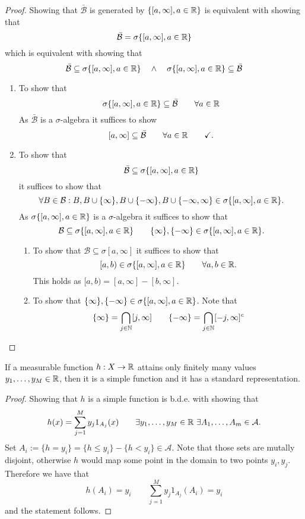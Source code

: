 \begin{proof}
Showing that \(\bar{\mathcal{B}}\) is generated by \(\{[a,\infty ],a\in \Bbb{R}\}\) is equivalent with showing that
\[
\bar{\mathcal{B}}=\sigma \{[a,\infty ],a\in \Bbb{R}\}
\]
which is equivalent with showing that
\[
\bar{\mathcal{B}}\subseteq \sigma \{[a,\infty ],a\in \Bbb{R}\} \quad \wedge  \quad \sigma \{[a,\infty ],a\in \Bbb{R}\} \subseteq \bar{\mathcal{B}}
\]

\begin{enumerate}
  \item To show that
\[
\sigma \{[a,\infty ],a\in \Bbb{R}\} \subseteq \bar{\mathcal{B}} \qquad \forall a\in \Bbb{R}
\]
As \(\bar{\mathcal{B}}\) is a \(\sigma \)-algebra it suffices to show
\[
[a,\infty ] \subseteq \bar{\mathcal{B}} \qquad \forall a\in \Bbb{R}\qquad \checkmark.
\]
  \item To show that
\[
\bar{\mathcal{B}}\subseteq \sigma \{[a,\infty ],a\in \Bbb{R}\} 
\]
it suffices to show that
\[
\forall B\in \mathcal{B} : B,B\cup \{\infty \},B\cup \{-\infty \},B\cup \{-\infty ,\infty \}\in \sigma \{[a,\infty ],a\in \Bbb{R}\}.
\]
As \(\sigma \{[a,\infty ],a\in \Bbb{R}\}\) is a \(\sigma \)-algebra it suffices to show that
\[
\mathcal{B}\subseteq \sigma \{[a,\infty ],a\in \Bbb{R}\} \qquad \{\infty \},\{-\infty \}\in \sigma \{[a,\infty ],a\in \Bbb{R}\}.
\]
\begin{enumerate}
  \item To show that \(\mathcal{B}\subseteq \sigma [a,\infty ]\) it suffices to show that
\[
[a,b)\in \sigma \{[a,\infty ],a\in \Bbb{R}\} \qquad \forall a,b\in \Bbb{R}.
\]
This holds as \([a,b)=[a,\infty ]-[b,\infty ].\)
  \item To show that \(\{\infty \},\{-\infty \}\in \sigma \{[a,\infty ],a\in \Bbb{R}\}\). Note that
\[
\{\infty \}=\bigcap _{j\in \Bbb{N}}[j,\infty ] \qquad \{-\infty \}=\bigcap _{j\in \Bbb{N}}[-j,\infty ]^c
\]
\end{enumerate}
\end{enumerate}

\end{proof}

\begin{prop}
If a measurable function \(h:X\rightarrow \Bbb{R}\) attains only finitely many values \(y_{1},\ldots ,y_M\in \Bbb{R}\), then it is a simple function and it has a standard representation.
\end{prop}

\begin{proof}
Showing that \(h\) is a simple function is b.d.e. with showing that
\[
h(x)=\sum _{j=1}^M y_{j}1_{A_{j}}(x) \qquad \exists y_{1},\ldots ,y_M\in \Bbb{R}\  \exists A_{1},\ldots ,A_{m}\in \mathcal{A}.
\]
Set \(A_{i}:=\{h=y_{i}\}=\{h\leq y_{i}\}-\{h<y_{i}\}\in \mathcal{A}\). Note that those sets are mutally disjoint, otherwise \(h\) would map some point in the domain to two points \(y_{i},y_{j}\). Therefore we have that
\[
h(A_{i})=y_{i} \qquad \sum _{j=1}^M y_{j}1_{A_{j}}(A_{i})=y_{i}
\]
and the statement follows.
\end{proof}


